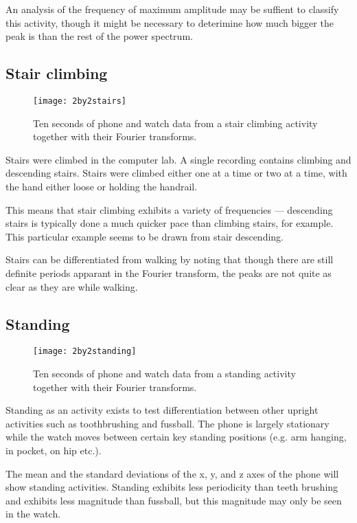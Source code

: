       An analysis of the frequency of maximum amplitude may be suffient to classify this activity, though it might be necessary to deterimine how much bigger the peak is than the rest of the power spectrum.
      
    \subsection{Stair climbing}
      \begin{figure}[!th]
        \centering
        \texttt{[image: 2by2stairs]}
        \caption{Ten seconds of phone and watch data from a stair climbing activity together with their Fourier transforms.}
        \label{fig:2by2stairs}
      \end{figure}
      Stairs were climbed in the computer lab. A single recording contains climbing and descending stairs. Stairs were climbed either one at a time or two at a time, with the hand either loose or holding the handrail.
      
      This means that stair climbing exhibits a variety of frequencies --- descending stairs is typically done a much quicker pace than climbing stairs, for example. This particular example seems to be drawn from stair descending.
      
      Stairs can be differentiated from walking by noting that though there are still definite periods apparant in the Fourier transform, the peaks are not quite as clear as they are while walking.
    \subsection{Standing}
      \begin{figure}
        \centering
        \texttt{[image: 2by2standing]}
        \caption{Ten seconds of phone and watch data from a standing activity together with their Fourier transforms.}
        \label{fig:2by2standing}
      \end{figure}
      Standing as an activity exists to test differentiation between other upright activities such as toothbrushing and fussball. The phone is largely stationary while the watch moves between certain key standing positions (e.g. arm hanging, in pocket, on hip etc.). 
      
      The mean and the standard deviations of the x, y, and z axes of the phone will show standing activities. Standing exhibits less periodicity than teeth brushing and exhibits less magnitude than fussball, but this magnitude may only be seen in the watch.
